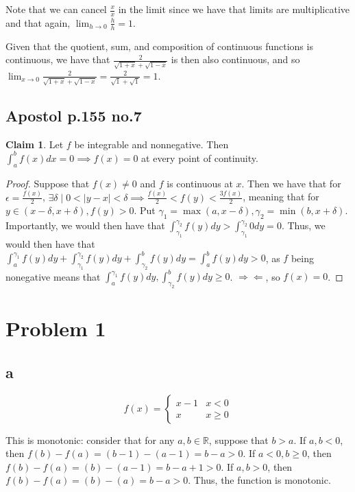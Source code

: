 \documentclass[12pt,letterpaper]{article}
\theoremstyle{definition}
\newtheorem*{claim}{Claim}
\newcommand{\contra}{\Rightarrow\!\Leftarrow}
\newcommand{\R}{\mathbb{R}}
\begin{document}
Note that we can cancel $\frac{x}{x}$ in the limit since we have that limits are
multiplicative and that again, $\lim_{h\rightarrow 0}\frac{h}{h} = 1$.

Given that the quotient, sum, and composition of continuous functions is
continuous, we have that $\frac{2}{\sqrt{1+x}+\sqrt{1-x}}$ is then also
continuous, and so $\lim_{x\rightarrow 0} \frac{2}{\sqrt{1+x}+\sqrt{1-x}} =
\frac{2}{\sqrt{1} + \sqrt{1}} = 1$.

\subsection*{Apostol p.155 no.7}

\begin{claim}
  Let $f$ be integrable and nonnegative. Then $\int_a^bf(x)dx = 0 \implies f(x)
  = 0$ at every point of continuity.
\end{claim}

\begin{proof}
  Suppose that $f(x) \neq 0$ and $f$ is continuous at $x$. Then we have that for
  $\epsilon = \frac{f(x)}{2}$, $\exists \delta \mid 0 < |y - x| < \delta
  \implies \frac{f(x)}{2} < f(y) < \frac{3f(x)}{2}$, meaning that for $y \in (x -
  \delta, x + \delta), f(y) > 0$. Put $\gamma_1 = \max(a, x-\delta), \gamma_2 =
  \min(b, x+\delta).$ Importantly, we would then have that $\int_{\gamma_1}^{\gamma_2}f(y)dy > \int_{\gamma_1}^{\gamma_2}0dy = 0$. Thus, we
  would then have that $\int_a^{\gamma_1} f(y)dy +
  \int_{\gamma_1}^{\gamma_2}f(y)dy + \int_{\gamma_2}^bf(y)dy = \int_a^bf(y)dy >
  0$, as $f$ being nonegative means that $\int_a^{\gamma_1}f(y)dy,
  \int_{\gamma_2}^bf(y)dy \geq 0$. $\contra$, so $f(x) = 0$.
\end{proof}

\section*{Problem 1}

\subsection*{a}

\[
  f(x) = \begin{cases}
    x - 1 & x < 0 \\
    x & x \geq 0
  \end{cases}
\]

This is monotonic: consider that for any $a,b \in \R$, suppose that $b > a$. If
$a,b < 0$, then $f(b) - f(a) = (b -1) - (a-1) = b-a > 0$. If $a < 0, b \geq 0$,
then $f(b) - f(a) = (b) - (a-1) = b-a + 1> 0$. If $a,b > 0$, then $f(b) - f(a)
= (b) - (a) = b-a > 0$. Thus, the function is monotonic.
\end{document}
